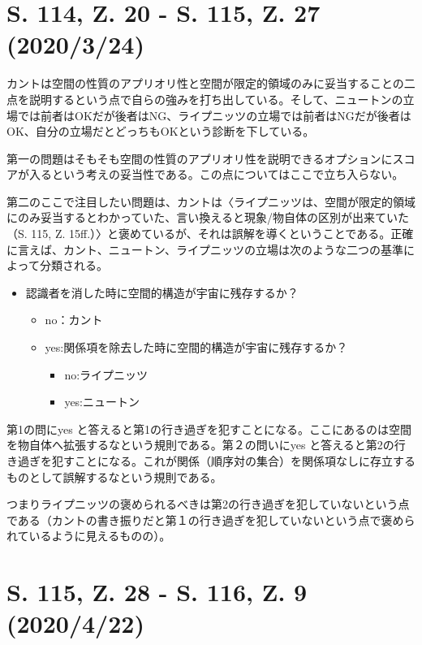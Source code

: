 \documentclass[12pt]{jsarticle}
\begin{document}
\section{S. 114, Z. 20 - S. 115, Z. 27 (2020/3/24)}
カントは空間の性質のアプリオリ性と空間が限定的領域のみに妥当することの二点を説明するという点で自らの強みを打ち出している。そして、ニュートンの立場では前者はOKだが後者はNG、ライプニッツの立場では前者はNGだが後者はOK、自分の立場だとどっちもOKという診断を下している。

第一の問題はそもそも空間の性質のアプリオリ性を説明できるオプションにスコアが入るという考えの妥当性である。この点についてはここで立ち入らない。

第二のここで注目したい問題は、カントは〈ライプニッツは、空間が限定的領域にのみ妥当するとわかっていた、言い換えると現象/物自体の区別が出来ていた（S. 115, Z. 15ff.）〉と褒めているが、それは誤解を導くということである。正確に言えば、カント、ニュートン、ライプニッツの立場は次のような二つの基準によって分類される。
\begin{itemize}
    \item 認識者を消した時に空間的構造が宇宙に残存するか？
    \begin{itemize}
        \item no：カント
        \item yes:関係項を除去した時に空間的構造が宇宙に残存するか？
        \begin{itemize}
            \item no:ライプニッツ
            \item yes:ニュートン
            
        \end{itemize}

            
        
    \end{itemize}
    
\end{itemize}
第1の問にyes と答えると第1の行き過ぎを犯すことになる。ここにあるのは空間を物自体へ拡張するなという規則である。第２の問いにyes と答えると第2の行き過ぎを犯すことになる。これが関係（順序対の集合）を関係項なしに存立するものとして誤解するなという規則である。

つまりライプニッツの褒められるべきは第2の行き過ぎを犯していないという点である（カントの書き振りだと第１の行き過ぎを犯していないという点で褒められているように見えるものの）。

\section{S. 115, Z. 28 - S. 116, Z. 9 (2020/4/22)}
\end{document}
